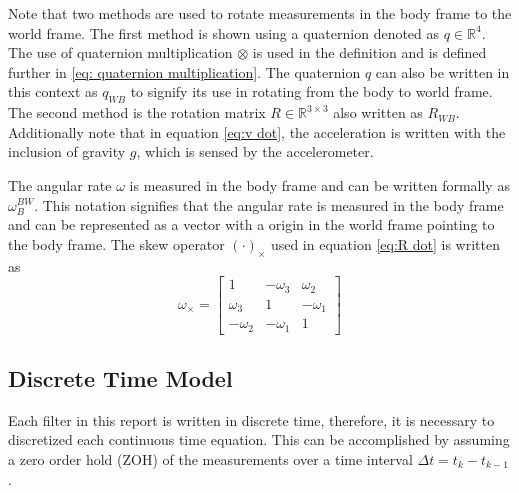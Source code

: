 Note that two methods are used to rotate measurements in the body frame to the world frame. The first method is shown using a quaternion denoted as $q \in \mathbb{R}^4$. The use of quaternion multiplication $\otimes$ is used in the definition and is defined further in \eqref{eq: quaternion multiplication}. The quaternion $q$ can also be written in this context as $q_{WB}$ to signify its use in rotating from the body to world frame. The second method is the rotation matrix $R \in \mathbb{R}^{3 \times 3}$  also written as $R_{WB}$. Additionally note that in equation \eqref{eq:v dot}, the acceleration is written with the inclusion of gravity $g$, which is sensed by the accelerometer.

The angular rate $\omega$ is measured in the body frame and can be written formally as $\omega_B^{BW}$. This notation signifies that the angular rate is measured in the body frame and can be represented as a vector with a origin in the world frame pointing to the body frame. The skew operator $(\cdot)_{\times}$ used in equation \eqref{eq:R dot} is written as
\begin{equation}
\omega_{\times} = 
\begin{bmatrix}
1 & -\omega_3 & \omega_2\\
\omega_3 & 1 & -\omega_1\\
-\omega_2 & -\omega_1 & 1
\end{bmatrix}
\label{eq:skew}
\end{equation}

\subsection{Discrete Time Model}

Each filter in this report is written in discrete time, therefore, it is necessary to discretized each continuous time equation. This can be accomplished by assuming a zero order hold (ZOH) of the measurements over a time interval $\Delta t = t_k - t_{k-1}$. 

